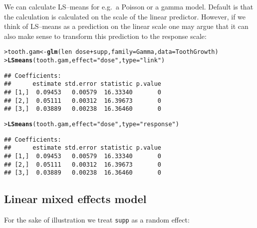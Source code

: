 \documentclass[11pt]{article}\usepackage[]{graphicx}\usepackage[]{color}
\makeatletter
\newcommand{\hlstr}[1]{\textcolor[rgb]{0.192,0.494,0.8}{#1}}%
\newcommand{\hlopt}[1]{\textcolor[rgb]{0,0,0}{#1}}%
\newcommand{\hlstd}[1]{\textcolor[rgb]{0.345,0.345,0.345}{#1}}%
\newcommand{\hlkwb}[1]{\textcolor[rgb]{0.69,0.353,0.396}{#1}}%
\newcommand{\hlkwc}[1]{\textcolor[rgb]{0.333,0.667,0.333}{#1}}%
\newcommand{\hlkwd}[1]{\textcolor[rgb]{0.737,0.353,0.396}{\textbf{#1}}}%
\newenvironment{kframe}{%
 \def\at@end@of@kframe{}%
 \ifinner\ifhmode%
  \def\at@end@of@kframe{\end{minipage}}%
  \begin{minipage}{\columnwidth}%
 \fi\fi%
 \def\FrameCommand##1{\hskip\@totalleftmargin \hskip-\fboxsep
 \colorbox{shadecolor}{##1}\hskip-\fboxsep
     \hskip-\linewidth \hskip-\@totalleftmargin \hskip\columnwidth}%
 \MakeFramed {\advance\hsize-\width
   \@totalleftmargin\z@ \linewidth\hsize
   \@setminipage}}%
 {\par\unskip\endMakeFramed%
 \at@end@of@kframe}
\newenvironment{knitrout}{}{} %
\renewenvironment{knitrout}{
  \begin{oldknitrout}
    \footnotesize
    \topsep=0pt
}{
  \end{oldknitrout}
}
\makeatother
\begin{document}
We can calculate LS--means for e.g.\ a Poisson or a gamma model. Default is that
the calculation is calculated on the scale of the linear
predictor. However, if
we think of LS--means as a prediction on the linear scale one may
argue that it can also make sense to transform this prediction to
the response scale:

\begin{knitrout}
\color{fgcolor}\begin{kframe}
\begin{alltt}
\hlstd{> }\hlstd{tooth.gam} \hlkwb{<-} \hlkwd{glm}\hlstd{(len} \hlopt{~} \hlstd{dose} \hlopt{+} \hlstd{supp,} \hlkwc{family}\hlstd{=Gamma,} \hlkwc{data}\hlstd{=ToothGrowth)}
\hlstd{> }\hlkwd{LSmeans}\hlstd{(tooth.gam,} \hlkwc{effect}\hlstd{=}\hlstr{"dose"}\hlstd{,} \hlkwc{type}\hlstd{=}\hlstr{"link"}\hlstd{)}
\end{alltt}
\begin{verbatim}
## Coefficients:
##      estimate std.error statistic p.value
## [1,]  0.09453   0.00579  16.33340       0
## [2,]  0.05111   0.00312  16.39673       0
## [3,]  0.03889   0.00238  16.36460       0
\end{verbatim}
\begin{alltt}
\hlstd{> }\hlkwd{LSmeans}\hlstd{(tooth.gam,} \hlkwc{effect}\hlstd{=}\hlstr{"dose"}\hlstd{,} \hlkwc{type}\hlstd{=}\hlstr{"response"}\hlstd{)}
\end{alltt}
\begin{verbatim}
## Coefficients:
##      estimate std.error statistic p.value
## [1,]  0.09453   0.00579  16.33340       0
## [2,]  0.05111   0.00312  16.39673       0
## [3,]  0.03889   0.00238  16.36460       0
\end{verbatim}
\end{kframe}
\end{knitrout}


\subsection{Linear mixed effects model}
\label{sec:linear-mixed-effects}


For the sake of illustration we treat \verb|supp| as a random effect:
\end{document}
